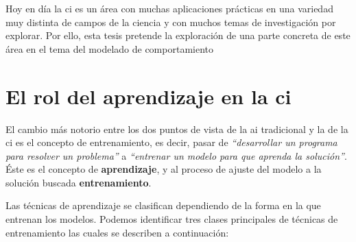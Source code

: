 
Hoy en día la \gls{ci} es un área con muchas aplicaciones prácticas en una variedad muy distinta de campos de la ciencia y con muchos temas de investigación por explorar. Por ello, esta tesis pretende la exploración de una parte concreta de este área en el tema del modelado de comportamiento

\section{El rol del aprendizaje en la \acrlong{ci}}
\label{s:the-learning-role}

El cambio más notorio entre los dos puntos de vista de la \gls{ai} tradicional y la de la \gls{ci} es el concepto de entrenamiento, es decir, pasar de \textit{\enquote{desarrollar un programa para resolver un problema}} a \textit{\enquote{entrenar un modelo para que aprenda la solución}}. Éste es el concepto de \textbf{aprendizaje}, y al proceso de ajuste del modelo a la solución buscada \textbf{entrenamiento}.

Las técnicas de aprendizaje se clasifican dependiendo de la forma en la que entrenan los modelos. Podemos identificar tres clases principales de técnicas de entrenamiento las cuales se describen a continuación:

